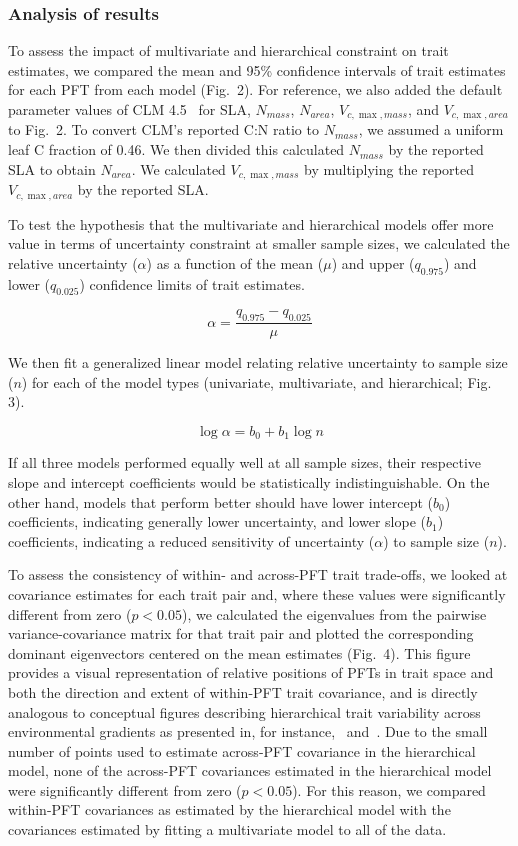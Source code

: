 \subsubsection{Analysis of results}

To assess the impact of multivariate and hierarchical constraint on trait estimates,
we compared the mean and 95\% confidence intervals of trait estimates for each PFT from each model (Fig.\ 2).
For reference, we also added the default parameter values of CLM 4.5~\cite[Table 8.1 in ]{clm45_note} for SLA, $N_{mass}$, $N_{area}$, $V_{c,\max,mass}$, and $V_{c,\max,area}$ to Fig.\ 2.
To convert CLM's reported C:N ratio to $N_{mass}$, we assumed a uniform leaf C fraction of 0.46.
We then divided this calculated $N_{mass}$ by the reported SLA to obtain $N_{area}$.
We calculated $V_{c,\max,mass}$ by multiplying the reported $V_{c,\max,area}$ by the reported SLA\@.

To test the hypothesis that the multivariate and hierarchical models offer more value in terms of uncertainty constraint at smaller sample sizes, we calculated the relative uncertainty ($\alpha$) as a function of the mean ($\mu$) and upper ($q_{0.975}$) and lower ($q_{0.025}$) confidence limits of trait estimates.

\[ \alpha = \frac{q_{0.975} - q_{0.025}}{\mu} \]

We then fit a generalized linear model relating relative uncertainty to sample size ($n$) for each of the model types (univariate, multivariate, and hierarchical; Fig. 3).

\[ \log{\alpha} = b_0 + b_1 \log{n} \]

If all three models performed equally well at all sample sizes, their respective slope and intercept coefficients would be statistically indistinguishable.
On the other hand, models that perform better should have
lower intercept ($b_0$) coefficients, indicating generally lower uncertainty,
and
lower slope ($b_1$) coefficients, indicating a reduced sensitivity of uncertainty ($\alpha$) to sample size ($n$).

To assess the consistency of within- and across-PFT trait trade-offs, we looked at covariance estimates for each trait pair and, where these values were significantly different from zero ($p < 0.05$),
we calculated the eigenvalues from the pairwise variance-covariance matrix for that trait pair and plotted the corresponding dominant eigenvectors centered on the mean estimates (Fig.\ 4).
This figure provides a visual representation of relative positions of PFTs in trait space and both the direction and extent of within-PFT trait covariance, and is directly analogous to conceptual figures describing hierarchical trait variability across environmental gradients as presented in, for instance,~\cite{cornwell_community_2009} and~\cite{albert_intraspecific_2010}.
Due to the small number of points used to estimate across-PFT covariance in the hierarchical model, none of the across-PFT covariances estimated in the hierarchical model were significantly different from zero ($p < 0.05$).
For this reason, we compared within-PFT covariances as estimated by the hierarchical model with the covariances estimated by fitting a multivariate model to all of the data.

